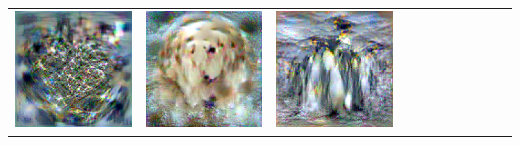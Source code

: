 {\begin{center}
\begin{tabular}{ccccccccccc}
    \includegraphics[align=c,width=\coverwidth\linewidth]{figures/cover/imagenet/french_horn_0.pdf} &
    \includegraphics[align=c,width=\coverwidth\linewidth]{figures/cover/imagenet/golden_retriever_0.pdf} &
    \includegraphics[align=c,width=\coverwidth\linewidth]{figures/cover/imagenet/king_penguin_0.pdf} &

\end{tabular}
\end{center}}
